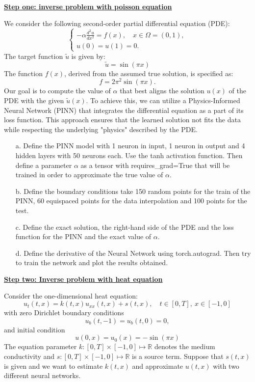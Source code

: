 \documentclass{article}
\newcommand{\step}[1]{\underline{\textbf{\large{#1}}} }
\begin{document}
\begin{center}\step{Step one: inverse problem with poisson equation}\end{center}
We consider the following second-order partial differential equation (PDE):
\[
  \begin{cases}
    -\alpha \frac{d^2u}{dx^2} = f(x), \quad x \in \Omega = (0,1), \\
    u(0) = u(1) =  0.
  \end{cases}
\]
\noindent
The target function $\tilde{u}$ is given by:
$$\tilde{u} = \sin(\pi x)$$
\noindent
The function $f(x)$, derived from the assumed true solution, is specified as:
$$f = 2 \pi^2 \sin(\pi x).$$
\noindent
Our goal is to compute the value of $\alpha$ that best aligns the solution $u(x)$ of the PDE with the given $\tilde{u}(x)$.
To achieve this, we can utilize a Physics-Informed Neural Network (PINN) that integrates the differential equation as a part of its loss function.
This approach ensures that the learned solution not fits the data while respecting the underlying "physics" described by the PDE.
\begin{itemize}
  \item[a.] Define the PINN model with 1 neuron in input, 1 neuron in output and 4 hidden layers with 50 neurons each. Use the tanh activation function. Then define a parameter $\alpha$ as a tensor with requires\_grad=True that will be trained in order to approximate the true value of $\alpha$.
  \item[b.] Define the boundary conditions take 150 random points for the train of the PINN, 60 equispaced points for the data interpolation and 100 points for the test.
  \item[c.] Define the exact solution, the right-hand side of the PDE and the loss function for the PINN and the exact value of $\alpha$.
  \item[d.] Define the derivative of the Neural Network using torch.autograd. Then try to train the network and plot the results obtained.
\end{itemize}

\newpage
\restoregeometry
\begin{center}\step{Step two: Inverse problem with heat equation}\end{center}
\noindent
Consider the one-dimensional heat equation:
$$
  u_t(t, x) = k(t,x)u_{xx}(t, x) + s(t, x), \quad t\in[0,T], ~x\in [-1,0]
$$
\noindent
with zero Dirichlet boundary conditions
$$
  u_b(t, -1)=u_b(t,0)=0,
$$
\noindent
and initial condition
$$
  u(0, x) = u_0(x) = - \sin(\pi x)
$$
\noindent
The equation parameter $k:[0,T]\times[-1,0]\mapsto \mathbb{R} $ denotes the medium conductivity and $s:[0,T]\times[-1,0]\mapsto \mathbb{R}$ is a source term. Suppose that $s(t,x)$ is given and we want to estimate $k(t,x)$ and approximate $u(t,x)$ with two different neural networks.
\end{document}
